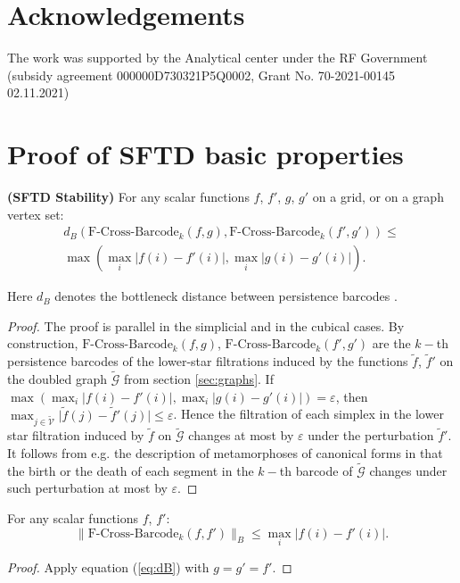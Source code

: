 \documentclass[runningheads]{llncs}
\begin{document}
\section*{Acknowledgements}
The work was supported by the Analytical center under the RF Government (subsidy agreement 000000D730321P5Q0002, Grant No. 70-2021-00145 02.11.2021)

%
%



\newpage

%
%
%
%
\appendix
\section{Proof of SFTD basic properties}
\label{sec:stability}

\begin{proposition}\label{prop:stab2}\textbf{(SFTD Stability)}
   For any scalar functions $f$, ${{f}'}$, $g$, 
 ${{g}'}$ on a grid, or on a graph vertex set: 
  \vskip-0.25in
\begin{multline}
    d_B(\text{F-Cross-Barcode} _ k(f,g), \text{F-Cross-Barcode} _ k({f}',{g}')) \leq \\ \max(\max _ {i} \lvert f(i)-{f}'(i)\rvert ,\max _ {i} \lvert g(i)-{g}'(i)\rvert ). \label{eq:dB}
\end{multline}
 \vskip-0.15in   
\end{proposition}
Here $d_B$ denotes the bottleneck distance between persistence barcodes \cite{chazal2017introduction}.
\begin{proof}The proof  is parallel in the simplicial and in the cubical cases. {By construction,  $\text{F-Cross-Barcode}_k(f,g)$, $\text{F-Cross-Barcode}_k(f',g')$ are the} $k-$th persistence barcodes of the lower-star filtrations induced by the functions $\tilde{f}$, $\tilde{f}'$
    on the doubled graph $\tilde{\mathcal{G}}$ from section \ref{sec:graphs}.  If $\max(\max _ {i} \lvert f(i)-{f}'(i)\rvert ,\max _ {i} \lvert g(i)-{g}'(i)\rvert )=\varepsilon$, then $\max_{{j}\in \tilde{\mathcal{V}}} \lvert \tilde{f}(j)-\tilde{f}'(j)\rvert\leq \varepsilon$. 
     Hence the filtration of each simplex in the lower star filtration induced by $\tilde{f}$ on   $\tilde{\mathcal{G}}$ changes at most by $\varepsilon$ under the perturbation $\tilde{f}'$.  It follows from e.g. the description of metamorphoses of canonical forms in \cite{barannikov1994framed} that the birth or the death of each segment in the $k-$th barcode of $\tilde{\mathcal{G}}$ changes under such perturbation at most by $\varepsilon$. 
\end{proof}
\begin{proposition} 
 For any scalar functions $f$, ${f}'$: 
 \vskip-0.1in
 $$\lVert \text{F-Cross-Barcode}_k(f,{f}')\rVert_B \leq \max_{i} \lvert f(i)-{f}'(i)\rvert.$$   
 \vskip-0.1in
\end{proposition}
\begin{proof}
    Apply equation (\ref{eq:dB}) with $g=g'=f'$.
\end{proof}
\end{document}
